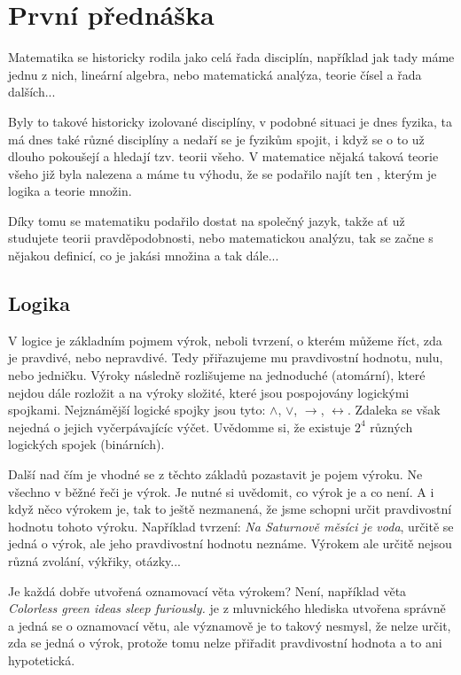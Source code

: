 \section{První přednáška}
Matematika se historicky rodila jako celá řada disciplín, například jak tady máme jednu
z nich, lineární algebra, nebo matematická analýza, teorie čísel a řada dalších...

Byly to takové historicky izolované disciplíny, v podobné situaci je dnes fyzika, ta
má dnes také různé disciplíny a nedaří se je fyzikům spojit, i když se o to už
dlouho pokoušejí a hledají tzv. teorii všeho. V matematice nějaká taková teorie všeho již
byla nalezena a máme tu výhodu, že se podařilo najít ten ,
kterým je logika a teorie množin.

Díky tomu se matematiku podařilo dostat na společný jazyk, takže ať už studujete
teorii pra\-vdě\-po\-dob\-no\-sti, nebo matematickou analýzu, tak se začne s nějakou
definicí, co je jakási množina a tak dále...

\subsection{Logika}
V logice je základním pojmem výrok, neboli tvrzení, o kterém můžeme říct, zda je pravdivé,
nebo nepravdivé. Tedy přiřazujeme mu pravdivostní hodnotu, nulu, nebo jedničku. Výroky následně
rozlišujeme na jednoduché (atomární), které nejdou dále rozložit a na výroky složité, které
jsou pospojovány logickými spojkami. Nejznámější logické spojky jsou tyto: $\wedge$, $\vee$,
$\rightarrow$, $\leftrightarrow$. Zdaleka se však nejedná o jejich vyčerpávajícíc výčet.
Uvědomme si, že existuje $2^4$ různých logických spojek (binárních).

Další nad čím je vhodné se z těchto základů pozastavit je pojem výroku. Ne všechno v běžné řeči
je výrok. Je nutné si uvědomit, co výrok je a co není. A i když něco výrokem je, tak to
ještě nezmanená, že jsme schopni určit pravdivostní hodnotu tohoto výroku. Například tvrzení:
\textit{Na Saturnově měsíci je voda}, určitě se jedná o výrok, ale jeho pravdivostní hodnotu neznáme.
Výrokem ale určitě nejsou různá zvolání, výkřiky, otázky...

Je každá dobře utvořená oznamovací věta výrokem? Není, například věta \textit{Colorless green ideas
sleep furiously.} je z mluvnického hlediska utvořena správně a jedná se o oznamovací větu, ale
významově je to takový nesmysl, že nelze určit, zda se jedná o výrok, protože tomu nelze přiřadit
pravdivostní hodnota a to ani hypotetická.

